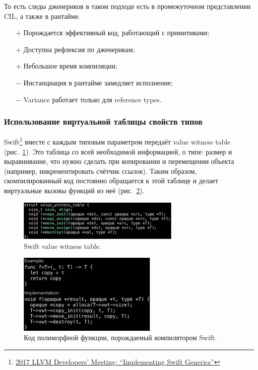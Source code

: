 \documentclass[12pt]{article}
\newcommand{\positive}{$+$} %
\newcommand{\negative}{{\color{red} $-$}} %
\begin{document}
    То есть следы дженериков в таком подходе есть в промежуточном представлении CIL, а также в рантайме.

    \begin{itemize}
        \item[\positive] Порождается эффективный код, работающий с примитивами;
        \item[\positive] Доступна рефлексия по дженерикам;
        \item[\positive] Небольшое время компиляции;
        \item[\negative] Инстанциация в рантайме замедляет исполнение;
        \item[\negative] Variance работает только для reference types.
    \end{itemize}


    \subsubsection{Использование виртуальной таблицы свойств типов} \label{subsubsec:swift-generics}

    Swift\footnote{\href{https://youtu.be/ctS8FzqcRug?si=y_ZYnuUOulA33d_X}{2017 LLVM Developers’ Meeting: ``Implementing Swift Generics''}} вместе с каждым типовым параметром передаёт value witness table (рис.~\ref{fig:swift-witness-table}).
    Это таблица со всей необходимой информацией, о типе: размер и выравнивание, что нужно сделать при копировании и перемещении объекта (например, инкрементировать счётчик ссылок).
    Таким образом, скомпилированный код постоянно обращается к этой таблице и делает виртуальные вызовы функций из неё (рис.~\ref{fig:swift-generated-code}).
    \begin{figure}
        \centering
        \includegraphics[width=0.7\textwidth]{figs/swift-witness-table}
        \caption{Swift value witness table.}
        \label{fig:swift-witness-table}
    \end{figure}
    \begin{figure}
        \centering
        \includegraphics[width=0.6\textwidth]{figs/swift-generated-code}
        \caption{Код полиморфной функции, порождаемый компилятором Swift.}
        \label{fig:swift-generated-code}
    \end{figure}
\end{document}
